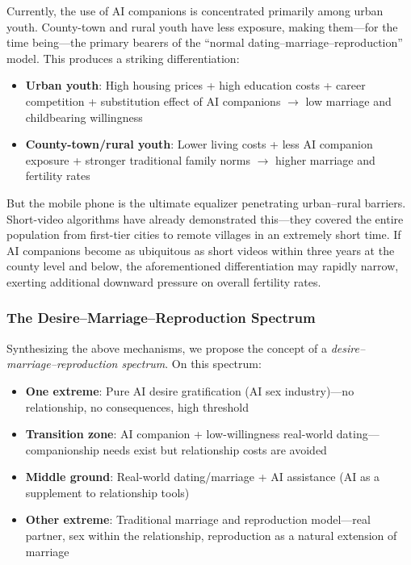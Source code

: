 ﻿\documentclass[12pt,a4paper]{article}
\begin{document}
Currently, the use of AI companions is concentrated primarily among urban youth. County-town and rural youth have less exposure, making them---for the time being---the primary bearers of the ``normal dating--marriage--reproduction'' model. This produces a striking differentiation:

\begin{itemize}
\item \textbf{Urban youth}: High housing prices + high education costs + career competition + substitution effect of AI companions ${}\to{}$ low marriage and childbearing willingness
\item \textbf{County-town/rural youth}: Lower living costs + less AI companion exposure + stronger traditional family norms ${}\to{}$ higher marriage and fertility rates
\end{itemize}

But the mobile phone is the ultimate equalizer penetrating urban--rural barriers. Short-video algorithms have already demonstrated this---they covered the entire population from first-tier cities to remote villages in an extremely short time. If AI companions become as ubiquitous as short videos within three years at the county level and below, the aforementioned differentiation may rapidly narrow, exerting additional downward pressure on overall fertility rates.

\subsubsection{The Desire--Marriage--Reproduction Spectrum}

Synthesizing the above mechanisms, we propose the concept of a \emph{desire--marriage--reproduction spectrum}. On this spectrum:
\begin{itemize}
\item \textbf{One extreme}: Pure AI desire gratification (AI sex industry)---no relationship, no consequences, high threshold
\item \textbf{Transition zone}: AI companion + low-willingness real-world dating---companionship needs exist but relationship costs are avoided
\item \textbf{Middle ground}: Real-world dating/marriage + AI assistance (AI as a supplement to relationship tools)
\item \textbf{Other extreme}: Traditional marriage and reproduction model---real partner, sex within the relationship, reproduction as a natural extension of marriage
\end{itemize}
\end{document}
